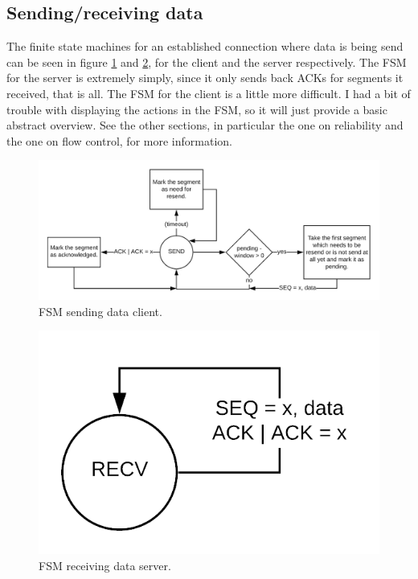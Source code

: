 \documentclass[a4paper]{article}
\begin{document}
	\subsection{Sending/receiving data}
	The finite state machines for an established connection where data is being send can be seen in figure \ref{fig: phase 2 client} and \ref{fig: phase 2 server}, for the client and the server respectively. The FSM for the server is extremely simply, since it only sends back ACKs for segments it received, that is all. The FSM for the client is a little more difficult. I had a bit of trouble with displaying the actions in the FSM, so it will just provide a basic abstract overview. See the other sections, in particular the one on reliability and the one on flow control, for more information.
	\begin{figure}[h]
		\centering
		\includegraphics[width = \textwidth]{phase2_client.png}
		\caption{FSM sending data client.}
		\label{fig: phase 2 client}
	\end{figure}
	\begin{figure}[h]
		\centering
		\includegraphics[width = .3\textwidth]{phase2_server.png}
		\caption{FSM receiving data server.}
		\label{fig: phase 2 server}
	\end{figure}
\end{document}
